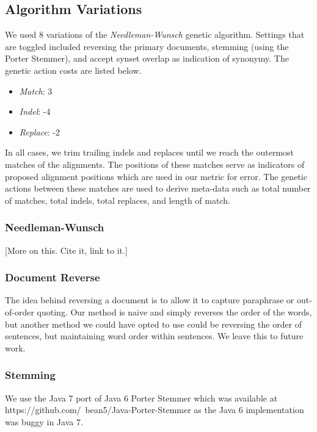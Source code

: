 \subsection{Algorithm Variations}
We used 8 variations of the \textit{Needleman-Wunsch} genetic algorithm. Settings that are toggled included reversing the primary documents, stemming (using the Porter Stemmer), and accept synset overlap as indication of synonymy. The genetic action costs are listed below. 

	\begin{itemize}
		\item \textit{Match}: 3
		\item \textit{Indel}: -4
		\item \textit{Replace}: -2
	\end{itemize}

In all cases, we trim trailing indels and replaces until we reach the outermost matches of the alignments. %
The positions of these matches serve as indicators of proposed alignment positions which are used in our metric for error. The genetic actions between these matches are used to derive meta-data such as total number of matches, total indels, total replaces, and length of match.

\subsubsection{Needleman-Wunsch}
[More on this. Cite it, link to it.]

\subsubsection{Document Reverse}
The idea behind reversing a document is to allow it to capture paraphrase or out-of-order quoting. Our method is naive and simply reverses the order of the words, but another method we could have opted to use could be reversing the order of sentences, but maintaining word order within sentences. We leave this to future work. 

\subsubsection{Stemming}
We use the Java 7 port of Java 6 Porter Stemmer which was available at https://github.com/~bean5/Java-Porter-Stemmer as the Java 6 implementation was buggy in Java 7.

